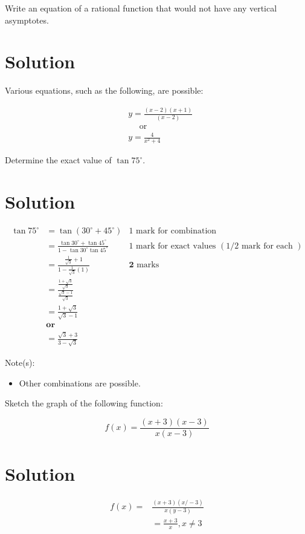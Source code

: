 \documentclass[10pt]{article}
\begin{document}
Write an equation of a rational function that would not have any vertical asymptotes.

\section*{Solution}
Various equations, such as the following, are possible:

$$
\begin{aligned}
& y=\frac{(x-2)(x+1)}{(x-2)} \\
& \quad \text { or } \\
& y=\frac{4}{x^{2}+4}
\end{aligned}
$$

Determine the exact value of $\tan 75^{\circ}$.

\section*{Solution}
$$
\begin{array}{rlr}
\tan 75^{\circ} & =\tan \left(30^{\circ}+45^{\circ}\right) & 1 \text { mark for combination } \\
& =\frac{\tan 30^{\circ}+\tan 45^{\circ}}{1-\tan 30^{\circ} \tan 45^{\circ}} & 1 \text { mark for exact values }(1 / 2 \text { mark for each }) \\
& =\frac{\frac{1}{\sqrt{3}}+1}{1-\frac{1}{\sqrt{3}}(1)} & \mathbf{2} \text { marks } \\
& =\frac{\frac{1+\sqrt{3}}{\sqrt{3}}}{\frac{\sqrt{3}-1}{\sqrt{3}}} \\
& =\frac{1+\sqrt{3}}{\sqrt{3}-1} \\
& \mathbf{o r} \\
& =\frac{\sqrt{3}+3}{3-\sqrt{3}}
\end{array}
$$

Note(s):

\begin{itemize}
  \item Other combinations are possible.
\end{itemize}

Sketch the graph of the following function:

$$
f(x)=\frac{(x+3)(x-3)}{x(x-3)}
$$

\section*{Solution}
$$
\begin{aligned}
f(x)= & \frac{(x+3)(x /-3)}{x(y-3)} \\
& =\frac{x+3}{x}, x \neq 3
\end{aligned}
$$
\end{document}
